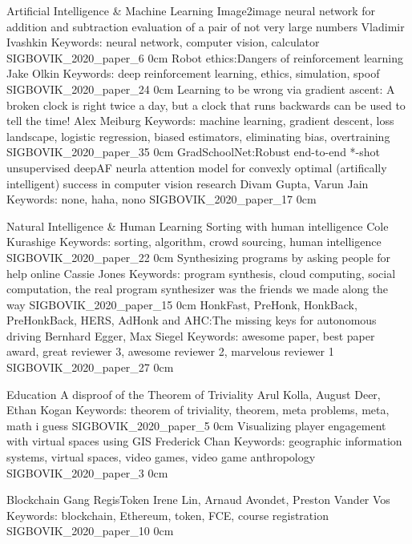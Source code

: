 \addtrack
	{}{Artificial Intelligence \& Machine Learning}
\addpaper
	{Image2image neural network for addition and subtraction evaluation of a pair of not very large numbers}
	{Vladimir Ivashkin}
	{Keywords: neural network, computer vision, calculator}
	{SIGBOVIK_2020_paper_6}
	{0cm}
	{}
\addpaper
	{Robot ethics:\@ Dangers of reinforcement learning}
	{Jake Olkin}
	{Keywords: deep reinforcement learning, ethics, simulation, spoof}
	{SIGBOVIK_2020_paper_24}
	{0cm}
	{}
\addpaper
	{Learning to be wrong via gradient ascent: A broken clock is right twice a day, but a clock that runs backwards can be used to tell the time!}
	{Alex Meiburg}
	{Keywords: machine learning, gradient descent, loss landscape, logistic regression, biased estimators, eliminating bias, overtraining}
	{SIGBOVIK_2020_paper_35}
	{0cm}
	{}
\addpaper
	{GradSchoolNet:\@ Robust end-to-end *-shot unsupervised deepAF neurla attention model for convexly optimal (artifically intelligent) success in computer vision research}
	{Divam Gupta, Varun Jain}
	{Keywords: none, haha, nono}
	{SIGBOVIK_2020_paper_17}
	{0cm}
	{}

\addtrack
	{}{Natural Intelligence \& Human Learning}
\addpaper
	{Sorting with human intelligence}
	{Cole Kurashige}
	{Keywords: sorting, algorithm, crowd sourcing, human intelligence}
	{SIGBOVIK_2020_paper_22}
	{0cm}
	{}
\addpaper
	{Synthesizing programs by asking people for help online}
	{Cassie Jones}
	{Keywords: program synthesis, cloud computing, social computation, the real program synthesizer was the friends we made along the way}
	{SIGBOVIK_2020_paper_15}
	{0cm}
	{}
\addpaper
	{HonkFast, PreHonk, HonkBack, PreHonkBack, HERS, AdHonk and AHC:\@ The missing keys for autonomous driving}
	{Bernhard Egger, Max Siegel}
	{Keywords: awesome paper, best paper award, great reviewer 3, awesome reviewer 2, marvelous reviewer 1}
	{SIGBOVIK_2020_paper_27}
	{0cm}
	{}

\addtrack
	{}{Education}
\addpaper
	{A disproof of the Theorem of Triviality}
	{Arul Kolla, August Deer, Ethan Kogan}
	{Keywords: theorem of triviality, theorem, meta problems, meta, math i guess}
	{SIGBOVIK_2020_paper_5}
	{0cm}
	{}
\addpaper
	{Visualizing player engagement with virtual spaces using GIS}
	{Frederick Chan}
	{Keywords: geographic information systems, virtual spaces, video games, video game anthropology}
	{SIGBOVIK_2020_paper_3}
	{0cm}
	{}

\addtrack
	{}{Blockchain Gang}
\addpaper
	{RegisToken}
	{Irene Lin, Arnaud Avondet, Preston Vander Vos}
	{Keywords: blockchain, Ethereum, token, FCE, course registration}
	{SIGBOVIK_2020_paper_10}
	{0cm}
	{}

